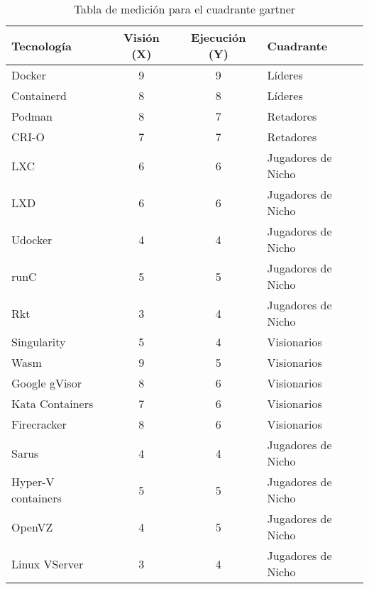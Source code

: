 \begin{table}[H]
\centering
\scriptsize
\setlength{\tabcolsep}{4pt}
\renewcommand{\arraystretch}{1.0}
\begin{tabular}{|p{}|c|c|p{}|}
\hline
\textbf{Tecnología} & \textbf{Visión (X)} & \textbf{Ejecución (Y)} & \textbf{Cuadrante} \\
\hline
Docker & 9 & 9 & Líderes \\
\hline
Containerd & 8 & 8 & Líderes \\
\hline
Podman & 8 & 7 & Retadores \\
\hline
CRI-O & 7 & 7 & Retadores \\
\hline
LXC & 6 & 6 & Jugadores de Nicho \\
\hline
LXD & 6 & 6 & Jugadores de Nicho \\
\hline
Udocker & 4 & 4 & Jugadores de Nicho \\
\hline
runC & 5 & 5 & Jugadores de Nicho \\
\hline
Rkt & 3 & 4 & Jugadores de Nicho \\
\hline
Singularity & 5 & 4 & Visionarios \\
\hline
Wasm & 9 & 5 & Visionarios \\
\hline
Google gVisor & 8 & 6 & Visionarios \\
\hline
Kata Containers & 7 & 6 & Visionarios \\
\hline
Firecracker & 8 & 6 & Visionarios \\
\hline
Sarus & 4 & 4 & Jugadores de Nicho \\
\hline
Hyper-V containers & 5 & 5 & Jugadores de Nicho \\
\hline
OpenVZ & 4 & 5 & Jugadores de Nicho \\
\hline
Linux VServer & 3 & 4 & Jugadores de Nicho \\
\hline
\end{tabular}
\caption{Tabla de medición para el cuadrante gartner}
\label{tab:cuadrante-gartner}
\end{table}